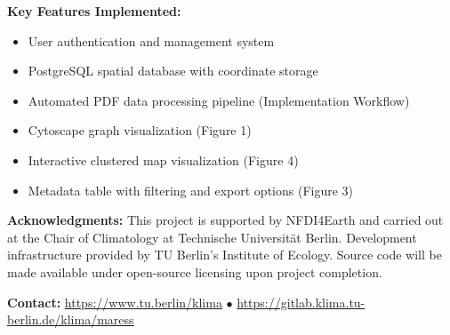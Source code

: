 \documentclass[a0,portrait]{a0poster}
\begin{document}
\begin{multicols}{3}
\begin{tcolorbox}[mainbox, title={\Large\textbf{Current Status \& Future Development}}]
		\textbf{Key Features Implemented:}
		\begin{itemize}[leftmargin=*]
      \item User authentication and management system
			\item PostgreSQL spatial database with coordinate storage
			\item Automated PDF data processing pipeline (Implementation Workflow)
			\item Cytoscape graph visualization (Figure 1)
      \item Interactive clustered map visualization (Figure 4)
      \item Metadata table with filtering and export options (Figure 3)
		\end{itemize}

	\end{tcolorbox}

\end{multicols}

\vspace{0.5cm}
\begin{center}
	\begin{tcolorbox}[bottombox, width=0.9\textwidth]
		\begin{center}
			\textbf{\large Acknowledgments:} This project is supported by NFDI4Earth and carried out at the Chair of Climatology at Technische Universität Berlin. Development infrastructure provided by TU Berlin's Institute of Ecology. Source code will be made available under open-source licensing upon project completion.

			\vspace{0.3cm}
			\textbf{\large Contact:} \url{https://www.tu.berlin/klima} $\bullet$ \url{https://gitlab.klima.tu-berlin.de/klima/maress}
		\end{center}
	\end{tcolorbox}
\end{center}

\vfill
\end{document}

